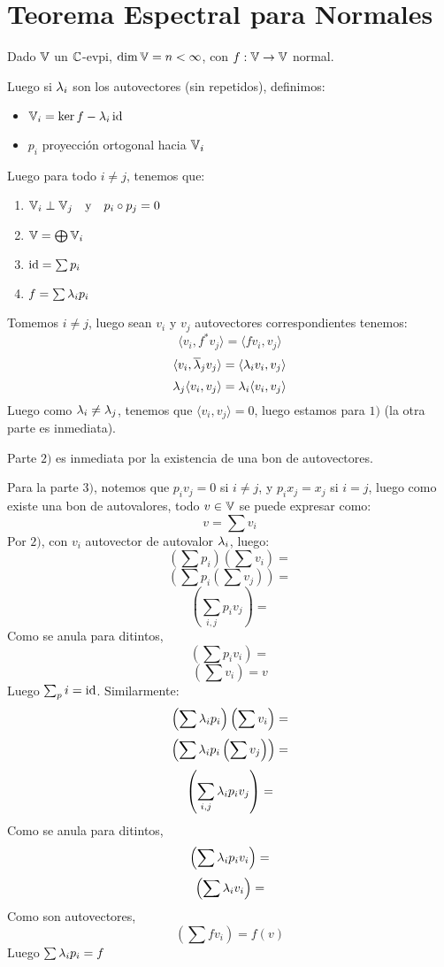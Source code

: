 \documentclass{article}
\begin{document}
\section*{Teorema Espectral para Normales}
\begin{teo}
    Dado $\mathbb{V}$ un $\mathbb{C}$-evpi, $\dim \mathbb{V} = n < \infty$, con $f : \mathbb{V} \to \mathbb{V}$ normal.

    Luego si $\lambda_i$ son los autovectores (sin repetidos), definimos:
    \begin{itemize}
        \item $\mathbb{V}_i = \ker f - \lambda_i \operatorname{id}$
        \item $p_i$ proyección ortogonal hacia $\mathbb{V}_i$
    \end{itemize}
    Luego para todo $i \neq j$, tenemos que:
    \begin{enumerate}
        \item $
        \mathbb{V}_i \perp \mathbb{V}_j \quad \text{y} \quad p_i \circ p_j = 0
    $
\item $
        \mathbb{V} = \bigoplus \mathbb{V}_i
    $
\item $
        \operatorname{id} = \sum p_i
    $
\item $
        f = \sum \lambda_i p_i
    $
    \end{enumerate}
\end{teo}
\begin{demo}
    Tomemos $i \neq j$, luego sean $v_i$ y $v_j$ autovectores correspondientes tenemos:
    \[\langle v_i, f^* v_j \rangle = \langle fv_i, v_j \rangle\]
    \[\langle v_i, \overline {\lambda}_j v_j \rangle = \langle \lambda_i v_i, v_j \rangle\]
    \[\lambda_j \langle v_i, v_j \rangle = \lambda_i \langle v_i, v_j \rangle\]
    Luego como $\lambda_i \neq \lambda_j$, tenemos que $\langle v_i , v_j\rangle = 0$, luego estamos para $1)$ (la otra parte es inmediata).

    Parte $2)$ es inmediata por la existencia de una bon de autovectores.

    Para la parte $3)$, notemos que $p_iv_j = 0$ si $i \neq j$, y $p_ix_j = x_j$ si $i = j$, luego como existe una bon de autovalores, todo $v \in \mathbb{V}$ se puede expresar como:
    \[
        v = \sum v_i
    \]
    Por $2)$, con $v_i$ autovector de autovalor $\lambda_i$, luego:
    \[
        \left(\sum p_i\right) \left(\sum v_i\right) =
    \]
    \[
        \left(\sum p_i \left(\sum v_j\right) \right)=
    \]
    \[
        \left(\sum_{i,j} p_i v_j \right)=
    \]
Como se anula para ditintos,
    \[
        \left(\sum p_i v_i \right) =
    \]
    \[
        \left(\sum v_i \right) = v
    \]
    Luego $\sum _pi = \operatorname{id}$. Similarmente:
    \[
        \left(\sum \lambda_i p_i\right) \left(\sum v_i\right) =
    \]
    \[
        \left(\sum \lambda_i p_i \left(\sum v_j\right) \right)=
    \]
    \[
        \left(\sum_{i,j} \lambda_i p_i v_j \right)=
    \]
Como se anula para ditintos,
    \[
        \left(\sum \lambda_i p_i v_i \right) =
    \]
    \[
        \left(\sum \lambda_i v_i \right) =
    \]
Como son autovectores,
    \[
        \left(\sum f v_i \right) = f(v)
    \]
Luego $\sum \lambda_i p_i = f$
\end{demo}
\end{document}
